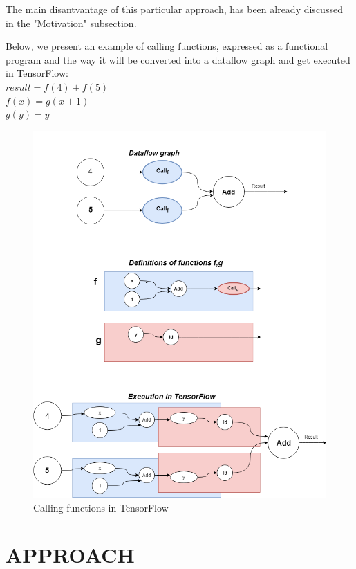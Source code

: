 \documentclass[ack,preface]{dithesis}
\begin{document}
The main disantvantage of this particular approach, has been already discussed in the "Motivation" subsection.

\begin{flushleft}
  Below, we present an example of calling functions, expressed as a functional program and the way it will be converted into a dataflow graph and get executed in TensorFlow: \\
 \setlength{\parindent}{25ex} $result = f(4) + f(5)$ \\
$f(x) = g(x+1)$ \\ 
$g(y) = y$
\end{flushleft}


\begin{figure}
\centering
\includegraphics[scale=0.6]{figures/Tf_recursion}
\caption{ Calling functions in TensorFlow}
\end{figure}


\chapter{APPROACH}
\end{document}
